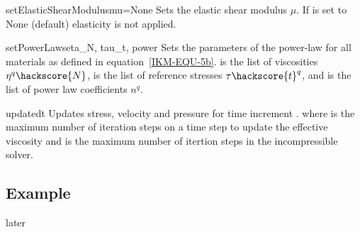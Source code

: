 \begin{methoddesc}[IncompressibleIsotropicFlowCartesian]{setElasticShearModulus}{mu=None}
Sets the elastic shear modulus $\mu$. If  is set to None (default) elasticity is not applied.
\end{methoddesc}


\begin{methoddesc}[IncompressibleIsotropicFlowCartesian]{setPowerLaws}{eta_N, tau_t, power}
Sets the parameters of the power-law for all materials as defined in 
equation~\ref{IKM-EQU-5b}.
 is the list of viscosities $\eta^{q}\hackscore{N}$,
 is the list of reference stresses  $\tau\hackscore{t}^q$,
and  is the list of  power law coefficients $n^{q}$.
\end{methoddesc}


\begin{methoddesc}[IncompressibleIsotropicFlowCartesian]{update}{dt
}
Updates stress, velocity and pressure for time increment .
where  is the maximum number of iteration steps on a time step to
update the effective viscosity and  is the maximum
number of itertion steps in the incompressible solver.
\end{methoddesc}

\subsection{Example}
later



